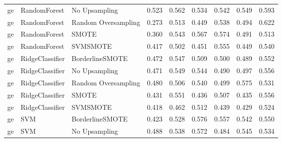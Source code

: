 \begin{tabular}{lllllllll}
      ge &                 RandomForest &       No Upsampling & 0.523 &                     0.562 &                 0.534 &                  0.542 &                                   0.549 &     0.593 \\
      ge &                 RandomForest & Random Oversampling & 0.273 &                     0.513 &                 0.449 &                  0.538 &                                   0.494 &     0.622 \\
      ge &                 RandomForest &               SMOTE & 0.360 &                     0.543 &                 0.567 &                  0.574 &                                   0.491 &     0.513 \\
      ge &                 RandomForest &            SVMSMOTE & 0.417 &                     0.502 &                 0.451 &                  0.555 &                                   0.449 &     0.540 \\
      ge &              RidgeClassifier &     BorderlineSMOTE & 0.472 &                     0.547 &                 0.509 &                  0.500 &                                   0.489 &     0.552 \\
      ge &              RidgeClassifier &       No Upsampling & 0.471 &                     0.549 &                 0.544 &                  0.490 &                                   0.497 &     0.556 \\
      ge &              RidgeClassifier & Random Oversampling & 0.480 &                     0.506 &                 0.540 &                  0.499 &                                   0.575 &     0.531 \\
      ge &              RidgeClassifier &               SMOTE & 0.431 &                     0.551 &                 0.436 &                  0.507 &                                   0.435 &     0.556 \\
      ge &              RidgeClassifier &            SVMSMOTE & 0.418 &                     0.462 &                 0.512 &                  0.439 &                                   0.429 &     0.524 \\
      ge &                          SVM &     BorderlineSMOTE & 0.423 &                     0.528 &                 0.576 &                  0.557 &                                   0.542 &     0.550 \\
      ge &                          SVM &       No Upsampling & 0.488 &                     0.538 &                 0.572 &                  0.484 &                                   0.545 &     0.534 \\

\end{tabular}
